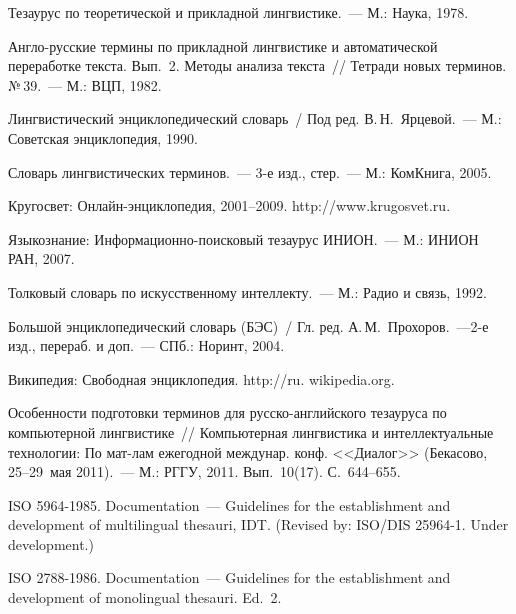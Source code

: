 \begin{multicols}{2}
{\small\frenchspacing
{%
\begin{thebibliography}{99}
  
  Тезаурус по теоретической и прикладной лингвистике.~--- М.: Наука, 1978.
  
  Англо-русские термины по прикладной лингвистике и автоматической переработке 
текста. Вып.~2. Методы анализа текста~// Тетради новых терминов. №\,39.~--- М.: ВЦП, 
1982.
  
  Лингвистический энциклопедический словарь~/ Под ред. В.\,Н.~Ярцевой.~--- М.: 
Советская энциклопедия, 1990. 

Словарь лингвистических терминов.~--- 3-е изд., стер.~--- М.: КомКнига, 2005. 
  
  Кругосвет: Онлайн-энциклопедия, 2001--2009. {\sf http://www.krugosvet.ru}.
  
  Языкознание: Информационно-поисковый тезаурус ИНИОН.~--- М.: ИНИОН РАН, 2007.
  
  Толковый словарь по искусственному интеллекту.~--- М.: Радио и связь, 1992.
  
  Большой энциклопедический словарь (БЭС)~/ Гл. ред. А.\,М.~Прохоров.~---2-е изд., 
перераб. и доп.~--- СПб.: Норинт, 2004. 
  
  Википедия: Свободная энциклопедия. {\sf http://ru. wikipedia.org}.
  
  Особенности подготовки терминов для русско-английского тезауруса по компьютерной 
лингвистике~// Компьютерная лингвистика и интеллектуальные технологии: По мат-лам 
ежегодной междунар. конф. <<Диалог>> (Бекасово, 25--29~мая 2011).~--- М.: РГГУ, 2011. 
Вып.~10(17). С.~644--655.
  
 
  ISO 5964-1985. Documentation~--- Guidelines for the establishment and development of 
multilingual thesauri, IDT. (Revised by: ISO/DIS 25964-1. Under development.)
  
  ISO 2788-1986. Documentation~--- Guidelines for the establishment and development of 
monolingual thesauri. Ed.~2.
  

\end{thebibliography}}}
\end{multicols}
